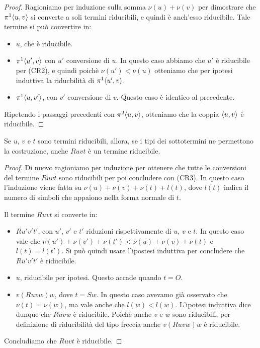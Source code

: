 \documentclass[]{marticle}
\begin{document}
\begin{proof}
    Ragioniamo per induzione sulla somma $\nu(u)+\nu(v)$ per dimostrare che
    $\pi^1\langle u,v \rangle$ si converte a soli termini riducibili, e quindi \`e
    anch'esso riducibile. Tale termine si pu\`o convertire in:
    \begin{itemize}
        \item $u$, che \`e riducibile.
        \item $\pi^1\langle u',v \rangle$ con $u'$ conversione di $u$. In questo caso
            abbiamo che $u'$ \`e riducibile per (CR2), e quindi poich\`e
            $\nu(u')<\nu(u)$ otteniamo che per ipotesi induttiva la
            riducbilit\`a di $\pi^1\langle u',v \rangle$.
        \item $\pi^1\langle u,v' \rangle$, con $v'$ conversione di $v$. Questo caso \`e
            identico al precedente.
    \end{itemize}

    Ripetendo i passaggi precedenti con $\pi^2\langle u,v \rangle$, otteniamo che la
    coppia $\langle u,v \rangle$ \`e riducibile.
\end{proof}

\begin{block}[Lemma]
    Se $u$, $v$ e $t$ sono termini riducibili, allora, se i tipi dei
    sottotermini ne permettono la costruzione, anche $Ruvt$ \`e un termine
    riducibile.
\end{block}

\begin{proof}
    Di nuovo ragioniamo per induzione per ottenere che tutte le conversioni del
    termine $Ruvt$ sono riducibili per poi concludere con (CR3). In questo caso
    l'induzione viene fatta su $\nu(u) + \nu(v) + \nu(t) + l(t)$, dove $l(t)$
    indica il numero di simboli che appaiono nella forma normale di $t$.

    Il termine $Ruvt$ si converte in:
    \begin{itemize}
        \item $Ru'v't'$, con $u'$, $v'$ e $t'$ riduzioni rispettivamente di $u$,
            $v$ e $t$. In questo caso vale che $\nu(u') + \nu(v') + \nu(t')
            < \nu(u) + \nu(v) + \nu(t)$ e $l(t)=l(t')$. Si pu\`o quindi usare
            l'ipostesi induttiva per concludere che $R u'v't'$ \`e riducibile.
        \item $u$, riducibile per ipotesi. Questo accade quando $t=O$. 
        \item $v(Ruvw)w$, dove $t=Sw$. In questo caso avevamo gi\`a osservato
            che $\nu(t) = \nu(w)$, ma vale anche che $l(w) < l(w)$. L'ipotesi
            induttiva dice dunque che $Ruvw$ \`e riducibile. Poich\`e anche $v$
            e $w$ sono riducibili, per definizione di riducibilit\`a del tipo
            freccia anche $v(Ruvw)w$ \`e riducibile.
    \end{itemize}
    Concludiamo che $Ruvt$ \`e riducibile.
\end{proof}
\end{document}
